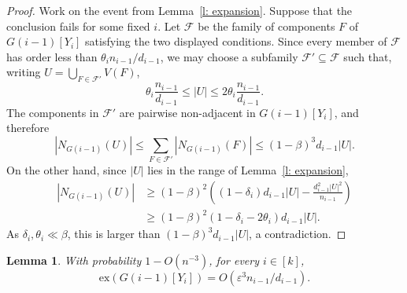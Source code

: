 \documentclass[reqno,a4paper]{amsart}
\newtheorem{lemma}[theorem]{Lemma}
\theoremstyle{definition}
\newcommand{\eps}{\varepsilon}
\newcommand{\ex}{\mathrm{ex}}
\newcommand{\cF}{\mathcal{F}}
\begin{document}
\begin{proof}
Work on the event from Lemma~\ref{l: expansion}. Suppose that the conclusion fails for some fixed $i$. Let $\cF$ be the family of components $F$ of $G(i-1)[Y_i]$ satisfying the two displayed conditions. Since every member of $\cF$ has order less than $\theta_in_{i-1}/d_{i-1}$, we may choose a subfamily $\cF'\subseteq\cF$ such that, writing $U=\bigcup_{F\in\cF'}V(F)$,
\[
    \theta_i\frac{n_{i-1}}{d_{i-1}}\le |U|\le 2\theta_i\frac{n_{i-1}}{d_{i-1}}.
\]
The components in $\cF'$ are pairwise non-adjacent in $G(i-1)[Y_i]$, and therefore
\[
    |N_{G(i-1)}(U)|\le \sum_{F\in\cF'}|N_{G(i-1)}(F)|\le (1-\beta)^3d_{i-1}|U|.
\]
On the other hand, since $|U|$ lies in the range of Lemma~\ref{l: expansion},
\begin{align*}
    |N_{G(i-1)}(U)|
    &\ge (1-\beta)^2\left((1-\delta_i)d_{i-1}|U|-\frac{d_{i-1}^2|U|^2}{n_{i-1}}\right) \\
    &\ge (1-\beta)^2(1-\delta_i-2\theta_i)d_{i-1}|U|.
\end{align*}
As $\delta_i,\theta_i\ll\beta$, this is larger than $(1-\beta)^3d_{i-1}|U|$, a contradiction.
\end{proof}

\begin{lemma}\label{l: excess}
With probability $1-O(n^{-3})$, for every $i\in[k]$,
\[
    \ex(G(i-1)[Y_i])=O(\eps^3n_{i-1}/d_{i-1}).
\]
\end{lemma}
\end{document}

